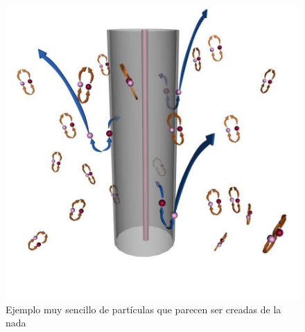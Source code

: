 \documentclass{beamer}
\begin{document}
\begin{frame}{}
     \begin{figure}[h]
        \centering
        \includegraphics[scale = 0.23]{Creacion.jpeg}
        \caption{Ejemplo muy sencillo de partículas que parecen ser creadas de la nada}
        \label{fig:Creacion}
    \end{figure}
\end{frame}
\end{document}
